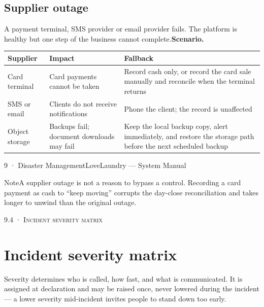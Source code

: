 \documentclass[11pt,a4paper,oneside]{book}
\begin{document}
\subsection*{Supplier outage}
A payment terminal, SMS provider or email provider fails. The platform is healthy but one step of the business cannot complete.\textbf{Scenario.}

\begin{center}\small
\begin{tabularx}{\linewidth}{|X|X|X|}
\hline
\rowcolor{lightgrey}
\textbf{Supplier} & \textbf{Impact} & \textbf{Fallback} \\ \hline
Card terminal & Card payments cannot be taken & Record cash only, or record the card sale manually and reconcile when the terminal returns \\ \hline
SMS or email & Clients do not receive notifications & Phone the client; the record is unaffected \\ \hline
Object storage & Backups fail; document downloads may fail & Keep the local backup copy, alert immediately, and restore the storage path before the next scheduled backup \\ \hline
\end{tabularx}
\end{center}
9 · Disaster ManagementLoveLaundry — System Manual

\begin{notebox}NoteA supplier outage is not a reason to bypass a control. Recording a card payment as cash to “keep moving” corrupts the day-close reconciliation and takes longer to unwind than the original outage.\end{notebox}
\textsc{\small\color{crimson}9.4 · Incident severity matrix}\par\medskip
\section*{Incident severity matrix}
Severity determines who is called, how fast, and what is communicated. It is assigned at declaration and may be raised once, never lowered during the incident — a lower severity mid-incident invites people to stand down too early.
\end{document}
